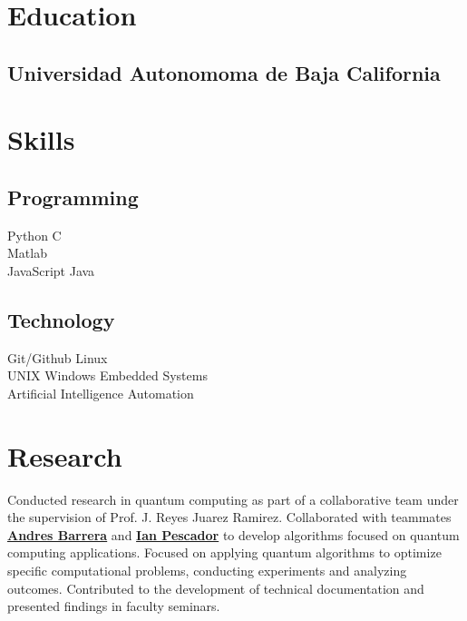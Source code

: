 \documentclass[]{deedy-resume-reversed}
\begin{document}
\begin{minipage}[t]{0.33\textwidth}


\section{Education}

\subsection{Universidad Autonomoma de Baja California}
\sectionsep


\section{Skills}
\subsection{Programming}
Python \textbullet{} C \\
Matlab \\
JavaScript \textbullet{} Java \\
\sectionsep

\subsection{Technology}
Git/Github \textbullet{} Linux \\
UNIX \textbullet{} Windows \textbullet{} Embedded Systems \\
Artificial Intelligence \textbullet{} Automation \\
\sectionsep


\section{Research}
Conducted research in quantum computing as part of a collaborative team under the supervision of Prof. J. Reyes Juarez Ramirez.
Collaborated with teammates \textbf{\href{https://www.linkedin.com/in/andres-barrera-34a488281/}{Andres Barrera}} and \textbf{\href{https://www.linkedin.com/in/ian-pescador-robles-03360128a/}{Ian Pescador}} to develop algorithms focused on quantum computing applications.
Focused on applying quantum algorithms to optimize specific computational problems, conducting experiments and analyzing outcomes.
Contributed to the development of technical documentation and presented findings in faculty seminars.
\sectionsep


\end{minipage}
\end{document}
